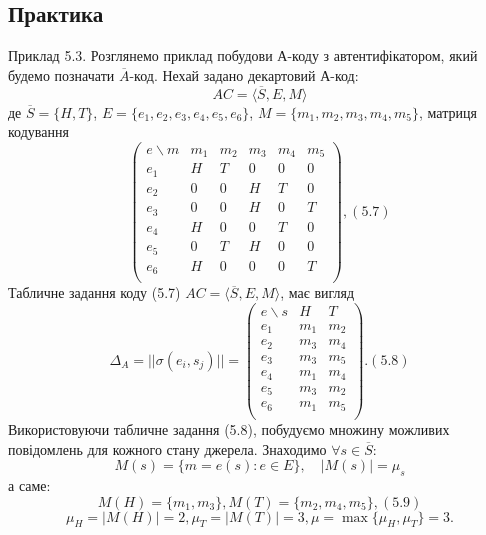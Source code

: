 \subsection{Практика}
\begin{example}
    Приклад 5.3. Розглянемо приклад побудови А-коду з автентифікатором,
    який будемо позначати $\overline{A}$-код. Нехай задано декартовий А-код:
    \begin{equation*}
        AC = \langle \overline{S}, E, M \rangle
    \end{equation*}
    де $\overline{S} = \{H, T\}$, $E = \{e_1, e_2, e_3, e_4, e_5, e_6\}$, $M = \{m_1, m_2, m_3, m_4, m_5\}$, матриця
    кодування
    \begin{equation*}
        \begin{pmatrix}
            e \backslash m & m_1 & m_2 & m_3 & m_4 & m_5 \\
            e_1 & H & T & 0 & 0 & 0 \\
            e_2 & 0 & 0 & H & T & 0 \\
            e_3 & 0 & 0 & H & 0 & T \\
            e_4 & H & 0 & 0 & T & 0 \\
            e_5 & 0 & T & H & 0 & 0 \\
            e_6 & H & 0 & 0 & 0 & T \\
        \end{pmatrix}, (5.7)
    \end{equation*}
    Табличне задання коду (5.7) $AC = \langle \overline{S}, E, M \rangle$, має вигляд
    \begin{equation*}
        \Delta_A = ||\sigma(e_i, s_j)||
        = \begin{pmatrix}
            e\backslash s & H & T \\
            e_1 & m_1 & m_2 \\
            e_2 & m_3 & m_4 \\
            e_3 & m_3 & m_5 \\
            e_4 & m_1 & m_4  \\
            e_5 & m_3 & m_2  \\
            e_6 & m_1 & m_5  \\
        \end{pmatrix}. (5.8)
    \end{equation*}
    Використовуючи табличне задання (5.8), побудуємо множину можливих
    повідомлень для кожного стану джерела. Знаходимо $\forall s \in \overline{S}$:
    \begin{equation*}
        M(s) = \{m = e(s): e \in E\}, \quad |M(s)| = \mu_s
    \end{equation*}
    а саме:
    \begin{equation}
        M(H) = \{m_1, m_3\}, M(T) = \{m_2, m_4, m_5\}, (5.9)
    \end{equation}
    \begin{equation*}
        \mu_H = |M(H)| = 2, \mu_T = |M(T)| = 3, \mu = \max\{\mu_H, \mu_T\} = 3.
    \end{equation*}
    

\end{example}
